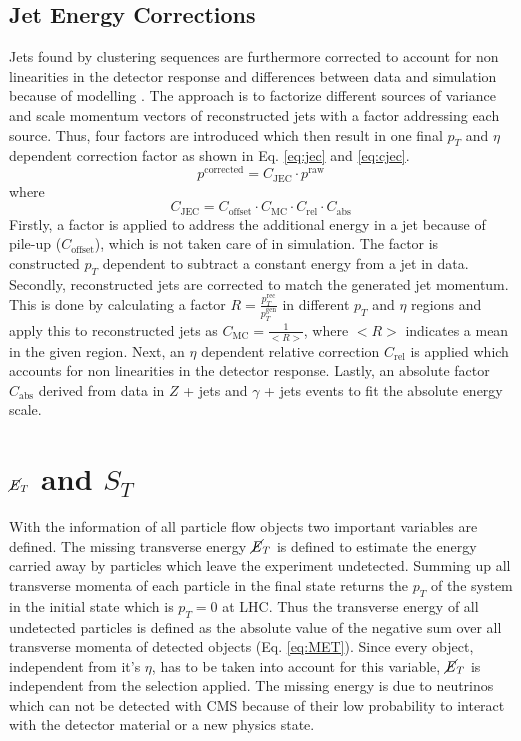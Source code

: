 \subsection{Jet Energy Corrections}
\label{sec:jec}
	Jets found by clustering sequences are furthermore corrected to account for non linearities in the detector response and differences between data and simulation because of modelling \cite{JEC}. The approach is to factorize different sources of variance and scale momentum vectors of reconstructed jets with a factor addressing each source. Thus, four factors are introduced which then result in one final $p_T$ and $\eta$ dependent correction factor as shown in Eq. \ref{eq:jec} and \ref{eq:cjec}.
	\begin{equation}
	p^{\text{corrected}} = C_{\text{JEC}} \cdot p^{\text{raw}}
	\label{eq:jec}
	\end{equation}
	where
	\begin{equation}
	C_{\text{JEC}} = C_{\text{offset}} \cdot C_{\text{MC}} \cdot C_{\text{rel}} \cdot C_{\text{abs}}
	\label{eq:cjec}
	\end{equation}
	Firstly, a factor is applied to address the additional energy in a jet because of pile-up ($C_{\text{offset}}$), which is not taken care of in simulation. The factor is constructed $p_T$ dependent to subtract a constant energy from a jet in data. Secondly, reconstructed jets are corrected to match the generated jet momentum. This is done by calculating a factor $R=\frac{p_T^{\text{rec}}}{p_T^{\text{gen}}}$ in different $p_T$ and $\eta$ regions and apply this to reconstructed jets as $C_{\text{MC}} = \frac{1}{<R>}$, where $<R>$ indicates a mean in the given region. Next, an $\eta$ dependent relative correction $C_{\text{rel}}$ is applied which accounts for non linearities in the detector response. Lastly, an absolute factor $C_{\text{abs}}$ derived from data in $Z$ + jets and $\gamma$ + jets events to fit the absolute energy scale.
	


\section{$\cancel{E}_T$ and $S_T$}
	With the information of all particle flow objects two important variables are defined. The missing transverse energy $\cancel{E}_T$ is defined to estimate the energy carried away by particles which leave the experiment undetected. Summing up all transverse momenta of each particle in the final state returns the $p_T$ of the system in the initial state which is $p_T = 0$ at LHC. Thus the transverse energy of all undetected particles is defined as the absolute value of the negative sum over all transverse momenta of detected objects (Eq. \ref{eq:MET}). Since every object, independent from it's $\eta$, has to be taken into account for this variable, $\cancel{E}_T$ is independent from the selection applied. The missing energy is due to neutrinos which can not be detected with CMS because of their low probability to interact with the detector material or a new physics state. 
	
